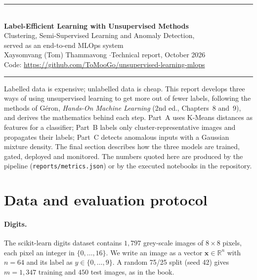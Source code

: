 \documentclass[11pt,a4paper]{article}
\newcommand{\R}{\mathbb{R}}
\newcommand{\x}{\mathbf{x}}
\begin{document}
\begin{center}
  {\color{tealhead}\rule{\linewidth}{1pt}}\\[0.6em]
  {\LARGE\bfseries Label-Efficient Learning with Unsupervised Methods}\\[0.4em]
  {\large Clustering, Semi-Supervised Learning and Anomaly Detection,\\ served as an end-to-end MLOps system}\\[0.8em]
  {\normalsize Xaysomvang (Tom) Thammavong \quad$\cdot$\quad Technical report, October 2026}\\[0.2em]
  {\small Code: \url{https://github.com/ToMooGo/unsupervised-learning-mlops}}\\[0.4em]
  {\color{tealhead}\rule{\linewidth}{1pt}}
\end{center}

\noindent
Labelled data is expensive; unlabelled data is cheap. This report develops three ways of using unsupervised
learning to get more out of fewer labels, following the methods of Géron, \emph{Hands-On Machine Learning}
(2nd ed., Chapters~8 and~9), and derives the mathematics behind each step. Part~A uses K-Means distances as
features for a classifier; Part~B labels only cluster-representative images and propagates their labels; Part~C
detects anomalous inputs with a Gaussian mixture density. The final section describes how the three models are
trained, gated, deployed and monitored. The numbers quoted here are produced by the pipeline
(\texttt{reports/metrics.json}) or by the executed notebooks in the repository.

\tableofcontents
\clearpage

\section{Data and evaluation protocol}

\paragraph{Digits.} The scikit-learn digits dataset contains $1{,}797$ grey-scale images of $8\times 8$ pixels,
each pixel an integer in $\{0,\dots,16\}$. We write an image as a vector $\x\in\R^{n}$ with $n=64$ and its label
as $y\in\{0,\dots,9\}$. A random 75/25 split (seed 42) gives $m=1{,}347$ training and $450$ test images, as in the
book.
\end{document}
